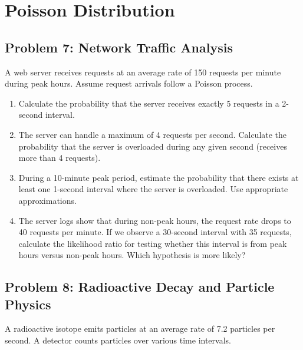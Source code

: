 \documentclass[12pt]{article}
\begin{document}

\section{Poisson Distribution}

\subsection*{Problem 7: Network Traffic Analysis}

A web server receives requests at an average rate of 150 requests per minute during peak hours. Assume request arrivals follow a Poisson process.

\begin{enumerate}[label=(\alph*)]
\item Calculate the probability that the server receives exactly 5 requests in a 2-second interval.

\item The server can handle a maximum of 4 requests per second. Calculate the probability that the server is overloaded during any given second (receives more than 4 requests).

\item During a 10-minute peak period, estimate the probability that there exists at least one 1-second interval where the server is overloaded. Use appropriate approximations.

\item The server logs show that during non-peak hours, the request rate drops to 40 requests per minute. If we observe a 30-second interval with 35 requests, calculate the likelihood ratio for testing whether this interval is from peak hours versus non-peak hours. Which hypothesis is more likely?
\end{enumerate}

\subsection*{Problem 8: Radioactive Decay and Particle Physics}

A radioactive isotope emits particles at an average rate of 7.2 particles per second. A detector counts particles over various time intervals.
\end{document}
